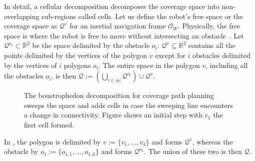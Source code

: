 In detail, a cellular decomposition decomposes the coverage space into non-overlapping sub-regions called cells. Let us define the robot's free space or the coverage space as $\mathcal{Q}^v$ for an inertial navigation frame $\mathcal{O}_W$. Physically, the free space is where the robot is free to move without intersecting an obstacle~\citep{choset2005principles}. Let $\mathcal{Q}^{o_i}\subset\mathbb{R}^2$ be the space delimited by the obstacle $o_i$. $\mathcal{Q}^v\subseteq\mathbb{R}^2$ contains all the points delimited by the vertices of the polygon $v$ except for $i$ obstacles delimited by the vertices of $i$ polygons $o_i$. The entire space in the polygon $v$, including all the obstacles $o_i$, is then $\mathcal{Q}:=(\bigcup_{i\in|o|}\mathcal{Q}^{o_i})\cup\mathcal{Q}^v$. 
\begin{figure}[h]
  \centering
  \selectfont
  
  \caption[Initial step of the boustrophedon decomposition]{The boustrophedon decomposition for coverage path planning sweeps the space and adds cells in case the sweeping line encounters a change in connectivity. Figure shows an initial step with $c_1$ the first cell formed.}
  \label{fig:bcd2}
\end{figure}
In , the polygon is delimited by $v:=\{v_1,\dots,v_4\}$ and forms $\mathcal{Q}^v$, whereas the obstacle by $o_1:=\{o_{1,1},\dots,o_{1,6}\}$ and forms $\mathcal{Q}^{o_1}$. The union of these two is then $\mathcal{Q}$.

